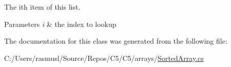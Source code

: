The i\textquotesingle{}th item of this list.


\begin{DoxyParams}{Parameters}
{\em i} & the index to lookup\\
\hline
\end{DoxyParams}


The documentation for this class was generated from the following file\+:\begin{DoxyCompactItemize}
\item 
C\+:/\+Users/rasmusl/\+Source/\+Repos/\+C5/\+C5/arrays/\hyperlink{_sorted_array_8cs}{Sorted\+Array.\+cs}\end{DoxyCompactItemize}
